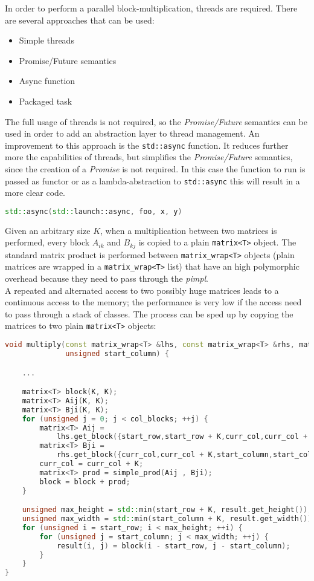 \documentclass[10pt,a4paper]{article}
\begin{document}
In order to perform a parallel block-multiplication, threads are required. There
are several approaches that can be used:
\begin{itemize}
    \item Simple threads
    \item Promise/Future semantics
    \item Async function
    \item Packaged task
\end{itemize}
The full usage of threads is not required, so the \textit{Promise/Future} semantics
can be used in order to add an abstraction layer to thread management. An improvement
to this approach is the \verb!std::async! function. It reduces further more the
capabilities of threads, but simplifies the \textit{Promise/Future} semantics, since
the creation of a \textit{Promise} is not required. In this case the function to run
is passed as functor or as a lambda-abstraction to \verb!std::async! this will result
in a more clear code.
\begin{lstlisting}[language= C++]
std::async(std::launch::async, foo, x, y)
\end{lstlisting}
Given an arbitrary size $K$, when a multiplication between two matrices is performed,
every block $A_{ik}$ and $B_{kj}$ is copied to a plain \verb!matrix<T>! object. The
standard matrix product is performed between \verb!matrix_wrap<T>! objects (plain
matrices are wrapped in a \verb!matrix_wrap<T>! list) that have an high polymorphic
overhead because they need to pass through the \textit{pimpl}.\\ A repeated and
alternated access to two possibly huge matrices leads to a continuous access to the
memory; the performance is very low if the access need to pass through a stack of
classes. The process can be sped up by copying the matrices to two plain
\verb!matrix<T>! objects:
\newpage
\begin{lstlisting}[language= C++]
void multiply(const matrix_wrap<T> &lhs, const matrix_wrap<T> &rhs, matrix<T> &result, unsigned start_row,
              unsigned start_column) {

    ...

    matrix<T> block(K, K);
    matrix<T> Aij(K, K);
    matrix<T> Bji(K, K);
    for (unsigned j = 0; j < col_blocks; ++j) {
        matrix<T> Aij =
            lhs.get_block({start_row,start_row + K,curr_col,curr_col + K});
        matrix<T> Bji =
            rhs.get_block({curr_col,curr_col + K,start_column,start_column + K});
        curr_col = curr_col + K;
        matrix<T> prod = simple_prod(Aij , Bji);
        block = block + prod;
    }

    unsigned max_height = std::min(start_row + K, result.get_height());
    unsigned max_width = std::min(start_column + K, result.get_width());
    for (unsigned i = start_row; i < max_height; ++i) {
        for (unsigned j = start_column; j < max_width; ++j) {
            result(i, j) = block(i - start_row, j - start_column);
        }
    }
}
\end{lstlisting}
\end{document}
